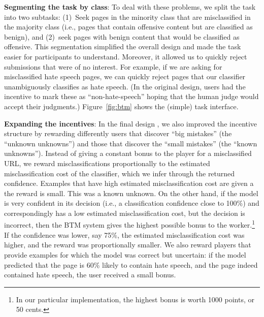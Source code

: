 \textbf{Segmenting the task by class}: To deal with these problems, we split the task into two subtasks: (1)~Seek pages in the minority class that are misclassified in the majority class (i.e., pages that contain offensive content but are classified as benign), and (2)~seek pages with benign content that would be classified as offensive. This segmentation simplified the overall design and made the task easier for participants to understand.  Moreover, it allowed us to quickly reject submissions that were of no interest.  For example, if we are asking for misclassified hate speech pages, we can quickly reject pages that our classifier unambiguously classifies as hate speech. (In the original design, users had the incentive to mark these as ``non-hate-speech'' hoping that the human judge would accept their judgments.) Figure~\ref{fig:btm} shows the (simple) task interface.

\textbf{Expanding the incentives}: In the final design , we also improved the incentive structure by rewarding differently users that discover ``big mistakes'' (the ``unknown unknowns'') and those that discover the ``small mistakes'' (the ``known unknowns''). Instead of giving a constant bonus to the player for a misclassified URL, we reward misclassifications proportionally to the estimated misclassification cost of the classifier, which we infer through the returned confidence.  
Examples that have high estimated misclassification cost are given a the reward is small.  This was a known unknown.
On the other hand, if the model is very confident in its decision (i.e., a classification confidence close to 100\%) and correspondingly has a low estimated misclassification cost, but the decision is incorrect, then the BTM system gives the highest possible bonus to the worker.\footnote{In our particular implementation, the highest bonus is worth 1000 points, or 50 cents.} If the confidence was lower, say 75\%, the estimated misclassification cost was higher, and the reward was proportionally smaller. We also reward players that provide examples for which the model was correct but uncertain: if the model predicted that the page is 60\% likely to contain hate speech, and the page indeed contained hate speech, the user received a small bonus.
